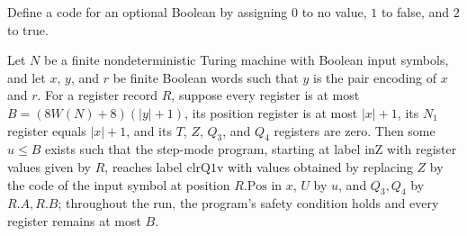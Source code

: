 \begin{definition}
\label{Complexity.Codec.zcode}
\leanok
Define a code for an optional Boolean by assigning $0$ to no value, $1$ to false, and
$2$ to true.
\end{definition}

\begin{theorem}
\label{Complexity.Codec.insym_run}
\leanok
{}
Let $N$ be a finite nondeterministic Turing machine with Boolean input symbols, and let
$x$, $y$, and $r$ be finite Boolean words such that $y$ is the pair encoding of $x$ and
$r$. For a register record $R$, suppose every register is at most $B=(8W(N)+8)(|y|+1)$,
its position register is at most $|x|+1$, its $N_1$ register equals $|x|+1$, and its
$T$, $Z$, $Q_3$, and $Q_4$ registers are zero. Then some $u\le B$ exists such that the
step-mode program, starting at label $\mathrm{inZ}$ with register values given by $R$,
reaches label $\mathrm{clrQ1v}$ with values obtained by replacing $Z$ by the code of the
input symbol at position $R.\mathrm{Pos}$ in $x$, $U$ by $u$, and $Q_3,Q_4$ by
$R.A,R.B$; throughout the run, the program's safety condition holds and every register
remains at most $B$.
\end{theorem}
